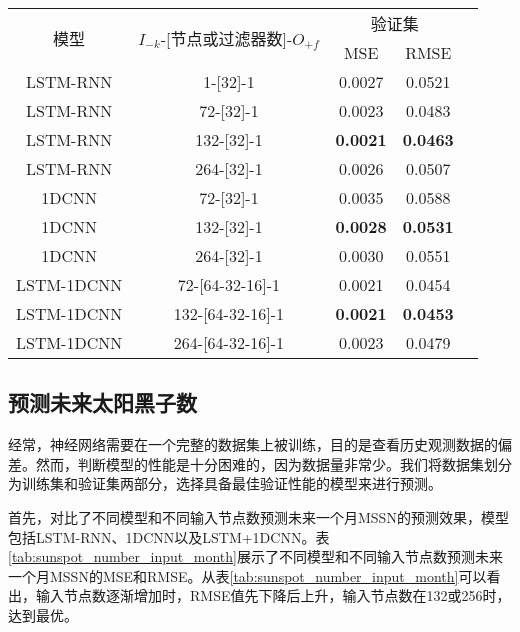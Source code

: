   \begin{table}[!htbp]
    \centering
    \label{tab:ss_area_out_1}
    \footnotesize
    \renewcommand{\arraystretch}{1}
    \begin{tabular}{ccccc}
      \toprule
      \multirow{2}{*}{模型} & \multirow{2}{*}{$I_{-k}$-[节点或过滤器数]-$O_{+f}$} & \multicolumn{2}{c}{验证集}\\
      \cmidrule(lr){3-4}
      \noalign{\smallskip}
      & & MSE & RMSE\\
      \midrule 
      LSTM-RNN & 1-[32]-1 & 0.0027 & 0.0521 \\
      LSTM-RNN & 72-[32]-1 & 0.0023 & 0.0483 \\
      LSTM-RNN & 132-[32]-1 & \textbf{0.0021} & \textbf{0.0463} \\
      LSTM-RNN & 264-[32]-1 & 0.0026 & 0.0507 \\
      \hline
      1DCNN & 72-[32]-1 & 0.0035 & 0.0588 \\
      1DCNN & 132-[32]-1 & \textbf{0.0028} & \textbf{0.0531} \\
      1DCNN & 264-[32]-1 & 0.0030 & 0.0551 \\
      \hline
      LSTM-1DCNN & 72-[64-32-16]-1 & 0.0021 & 0.0454 \\
      LSTM-1DCNN & 132-[64-32-16]-1 & \textbf{0.0021} & \textbf{0.0453} \\
      LSTM-1DCNN & 264-[64-32-16]-1 & 0.0023 & 0.0479 \\
      \bottomrule
    \end{tabular}
  \end{table}



\subsection{预测未来太阳黑子数}\label{sec:ss_result_number}

经常，神经网络需要在一个完整的数据集上被训练，目的是查看历史观测数据的偏差。然而，判断模型的性能是十分困难的，因为数据量非常少。我们将数据集划分为训练集和验证集两部分，选择具备最佳验证性能的模型来进行预测。

首先，对比了不同模型和不同输入节点数预测未来一个月MSSN的预测效果，模型包括LSTM-RNN、1DCNN以及LSTM+1DCNN。表\ref{tab:sunspot_number_input_month}展示了不同模型和不同输入节点数预测未来一个月MSSN的MSE和RMSE。从表\ref{tab:sunspot_number_input_month}可以看出，输入节点数逐渐增加时，RMSE值先下降后上升，输入节点数在132或256时，达到最优。

